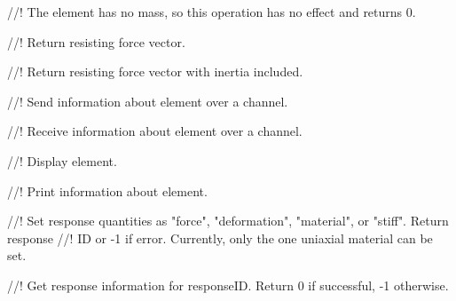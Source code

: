 //! The element has no mass, so this operation has no effect and returns 0.


//! Return resisting force vector.


//! Return resisting force vector with inertia included.


//! Send information about element over a channel.


//! Receive information about element over a channel.


//! Display element.


//! Print information about element.


//! Set response quantities as "force", "deformation", "material", or "stiff".  Return response
//! ID  or -1 if error.  Currently, only the one uniaxial material can be set.


//! Get response information for \p responseID.  Return 0 if successful, -1 otherwise.







